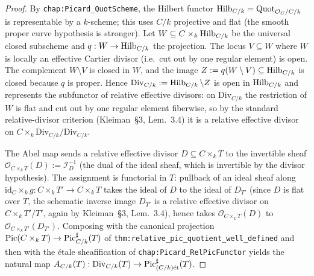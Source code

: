 \begin{proof}
  
  By \texttt{chap:Picard_QuotScheme}, the Hilbert functor \(\operatorname{Hilb}_{C/k} =
  \operatorname{Quot}_{\mathcal{O}_C/C/k}\) is representable by a \(k\)-scheme; this uses
  \(C/k\) projective and flat (the smooth proper curve hypothesis is
  stronger). Let \(W \subseteq C \times_k \operatorname{Hilb}_{C/k}\) be the universal
  closed subscheme and \(q : W \to \operatorname{Hilb}_{C/k}\) the projection. The locus
  \(V \subseteq W\) where \(W\) is locally an effective Cartier divisor (i.e.\
  cut out by one regular element) is open. The complement \(W \setminus V\)
  is closed in \(W\), and the image \(Z := q(W \setminus V) \subseteq
  \operatorname{Hilb}_{C/k}\) is closed because \(q\) is proper. Hence \(\mathrm{Div}_{C/k} :=
  \operatorname{Hilb}_{C/k} \setminus Z\) is open in \(\operatorname{Hilb}_{C/k}\) and represents the
  subfunctor of relative effective divisors: on \(\mathrm{Div}_{C/k}\) the
  restriction of \(W\) is flat and cut out by one regular element fiberwise,
  so by the standard relative-divisor criterion (Kleiman~\S 3,
  Lem.~3.4) it is a relative effective divisor on \(C \times_k
  \mathrm{Div}_{C/k} / \mathrm{Div}_{C/k}\).

  The Abel map sends a relative effective divisor \(D \subseteq C \times_k T\)
  to the invertible sheaf \(\mathcal{O}_{C \times_k T}(D) := \mathcal{I}_D^{-1}\)
  (the dual of the ideal sheaf, which is invertible by the divisor
  hypothesis). The assignment is functorial in \(T\): pullback of an ideal
  sheaf along \(\mathrm{id}_C \times_k g : C \times_k T' \to C \times_k T\)
  takes the ideal of \(D\) to the ideal of \(D_{T'}\) (since \(D\) is flat over
  \(T\), the schematic inverse image \(D_{T'}\) is a relative effective
  divisor on \(C \times_k T'/T'\), again by Kleiman~\S 3, Lem.~3.4), hence
  takes \(\mathcal{O}_{C \times_k T}(D)\) to \(\mathcal{O}_{C \times_k T'}(D_{T'})\).
  Composing with the canonical projection
  \(\operatorname{Pic}(C \times_k T) \to \operatorname{Pic}^\sharp_{C/k}(T)\) of
  \texttt{thm:relative_pic_quotient_well_defined} and then with the
  \'etale sheafification of \texttt{chap:Picard_RelPicFunctor} yields the
  natural map \(A_{C/k}(T) : \mathrm{Div}_{C/k}(T) \to \operatorname{Pic}^\sharp_{(C/k)\mathrm{\acute{e}t}}(T)\).
\end{proof}

